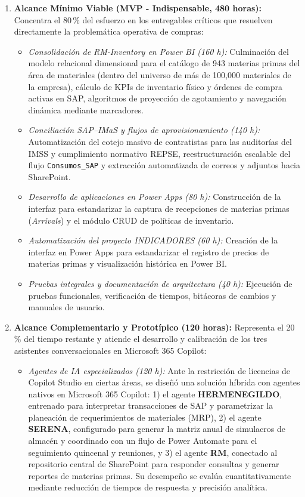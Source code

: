 \begin{enumerate}
    \item \textbf{Alcance Mínimo Viable (MVP - Indispensable, 480 horas):} Concentra el 80\,\% del esfuerzo en los entregables críticos que resuelven directamente la problemática operativa de compras:
    \begin{itemize}
        \item \emph{Consolidación de RM-Inventory en Power BI (160 h):} Culminación del modelo relacional dimensional para el catálogo de 943 materias primas del área de materiales (dentro del universo de más de 100,000 materiales de la empresa), cálculo de KPIs de inventario físico y órdenes de compra activas en SAP, algoritmos de proyección de agotamiento y navegación dinámica mediante marcadores.
        \item \emph{Conciliación SAP--IMaS y flujos de aprovisionamiento (140 h):} Automatización del cotejo masivo de contratistas para las auditorías del IMSS y cumplimiento normativo REPSE, reestructuración escalable del flujo \texttt{Consumos\_SAP} y extracción automatizada de correos y adjuntos hacia SharePoint.
        \item \emph{Desarrollo de aplicaciones en Power Apps (80 h):} Construcción de la interfaz para estandarizar la captura de recepciones de materias primas (\emph{Arrivals}) y el módulo CRUD de políticas de inventario.
        \item \emph{Automatización del proyecto INDICADORES (60 h):} Creación de la interfaz en Power Apps para estandarizar el registro de precios de materias primas y visualización histórica en Power BI.
        \item \emph{Pruebas integrales y documentación de arquitectura (40 h):} Ejecución de pruebas funcionales, verificación de tiempos, bitácoras de cambios y manuales de usuario.
    \end{itemize}
    \item \textbf{Alcance Complementario y Prototípico (120 horas):} Representa el 20\,\% del tiempo restante y atiende el desarrollo y calibración de los tres asistentes conversacionales en Microsoft 365 Copilot:
    \begin{itemize}
        \item \emph{Agentes de IA especializados (120 h):} Ante la restricción de licencias de Copilot Studio en ciertas áreas, se diseñó una solución híbrida con agentes nativos en Microsoft 365 Copilot: 1) el agente \textbf{HERMENEGILDO}, entrenado para interpretar transacciones de SAP y parametrizar la planeación de requerimientos de materiales (MRP), 2) el agente \textbf{SERENA}, configurado para generar la matriz anual de simulacros de almacén y coordinado con un flujo de Power Automate para el seguimiento quincenal y reuniones, y 3) el agente \textbf{RM}, conectado al repositorio central de SharePoint para responder consultas y generar reportes de materias primas. Su desempeño se evalúa cuantitativamente mediante reducción de tiempos de respuesta y precisión analítica.
    \end{itemize}
\end{enumerate}

